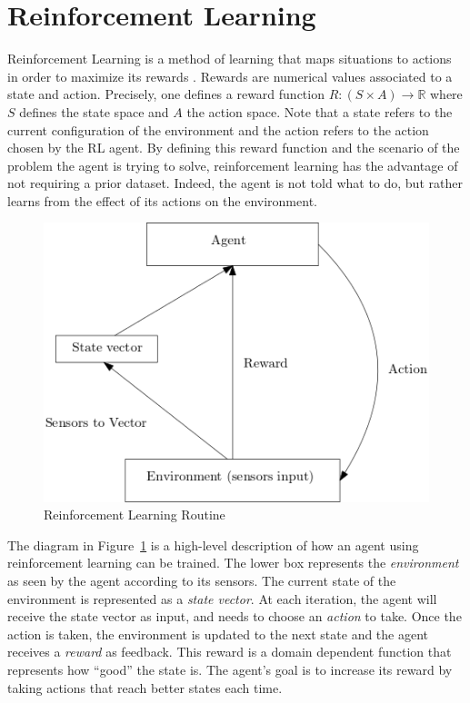 \section{Reinforcement Learning} 

Reinforcement Learning is a method of learning that maps situations to
actions in order to maximize its rewards
\cite{sutton2018reinforcement}. Rewards are numerical values associated to a state and action. Precisely, one defines a reward function 
$R : (S \times A) \rightarrow \mathbb{R}$ where $S$ defines the state space and $A$ the action space. Note that a state refers to the current configuration
of the environment and the action refers to the action chosen by the RL agent. By defining this reward function and the scenario of the problem the agent is trying to solve, 
reinforcement learning has the advantage of not requiring a prior dataset. Indeed, the agent is not told what to do, but rather 
learns from the effect of its actions on the environment. 

\begin{figure}[H]
  \centering
  \includegraphics[scale=0.6]{figures/rlroutine.png}
  \caption{Reinforcement Learning Routine}
  \label{fig:rl}
\end{figure}


The diagram in Figure~\ref{fig:rl} is a high-level description of how
an agent using reinforcement learning can be trained.  
%
The lower box represents the \emph{environment} as seen by the agent
according to its sensors.
%
The current state of the environment is represented as a \emph{state
vector}.
%
At each iteration, the agent will receive the state vector as input,
and needs to choose an \emph{action} to take.
%
Once the action is taken, the environment is updated to the next state
and the agent receives a \emph{reward} as feedback.
%
This reward is a domain dependent function that represents how
``good'' the state is.
%
The agent's goal is to increase its reward by taking actions that
reach better states each time.

